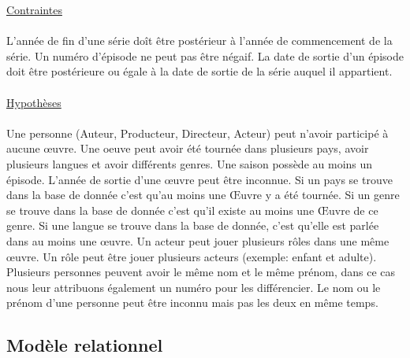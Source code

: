 \documentclass[10pt,a4paper]{article}
\begin{document}
\noindent\underline{Contraintes}
\\ \\ L'année de fin d'une série doît être postérieur à l'année de commencement de la série. Un numéro d’épisode ne peut pas être négaif.
La date de sortie d’un épisode doit être postérieure ou égale à la date de sortie de la série auquel il appartient.
\\
\\
\noindent\underline{Hypothèses}
\\ \\ Une personne (Auteur, Producteur, Directeur, Acteur) peut n’avoir participé à aucune œuvre.
Une oeuve peut avoir été tournée dans plusieurs pays, avoir plusieurs langues et avoir différents genres.
Une saison possède au moins un épisode.
L’année de sortie d’une œuvre peut être inconnue.
Si un pays se trouve dans la base de donnée c’est qu’au moins une Œuvre y a été tournée.
Si un genre se trouve dans la base de donnée c’est qu’il existe au moins une Œuvre de ce genre.
Si une langue se trouve dans la base de donnée, c’est qu’elle est parlée dans au moins une œuvre.
Un acteur peut jouer plusieurs rôles dans une même œuvre.
Un rôle peut être jouer plusieurs acteurs (exemple: enfant et adulte).
Plusieurs personnes peuvent avoir le même nom et le même prénom, dans ce cas nous leur attribuons également un numéro pour les différencier.
Le nom ou le prénom d’une personne peut être inconnu mais pas les deux en même temps.

\subsection{Modèle relationnel}
\end{document}
